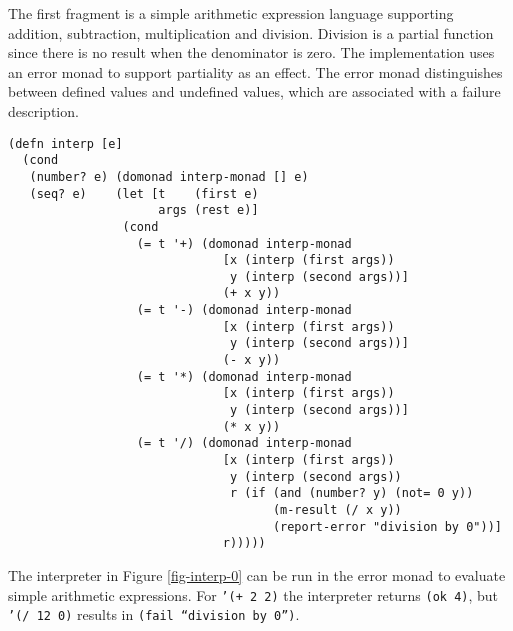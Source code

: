 \documentclass[natbib,10pt]{sigplanconf}
\begin{document}
The first fragment is a simple arithmetic expression language
supporting addition, subtraction, multiplication and division.
Division is a partial function since there is no result when the
denominator is zero.  The implementation uses an error monad to
support partiality as an effect.  The error monad distinguishes
between defined values and undefined values, which are associated
with a failure description.

\begin{figure*}
\begin{center}
\begin{verbatim}
(defn interp [e]
  (cond
   (number? e) (domonad interp-monad [] e)
   (seq? e)    (let [t    (first e)
                     args (rest e)]
                (cond
                  (= t '+) (domonad interp-monad
                              [x (interp (first args))
                               y (interp (second args))]
                              (+ x y))
                  (= t '-) (domonad interp-monad
                              [x (interp (first args))
                               y (interp (second args))]
                              (- x y))
                  (= t '*) (domonad interp-monad
                              [x (interp (first args))
                               y (interp (second args))]
                              (* x y))
                  (= t '/) (domonad interp-monad
                              [x (interp (first args))
                               y (interp (second args))
                               r (if (and (number? y) (not= 0 y))
                                     (m-result (/ x y))
                                     (report-error "division by 0"))]
                              r)))))
\end{verbatim}
\end{center}
\caption{Interpreter for an arithmetic expression language}
\label{fig-interp-0}
\end{figure*}

The interpreter in Figure \ref{fig-interp-0} can be run in the error
monad to evaluate simple arithmetic expressions.  For {\tt '(+ 2 2)}
the interpreter returns {\tt (ok 4)}, but {\tt '(/ 12 0)} results in
{\tt (fail ``division by 0'')}.
\end{document}
